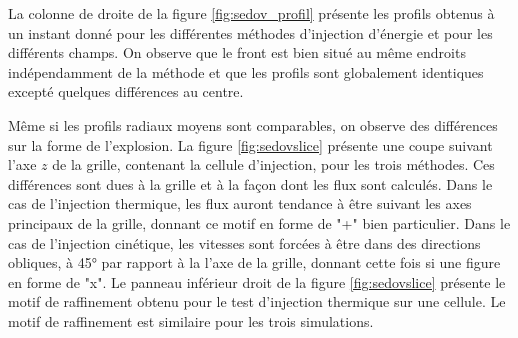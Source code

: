 La colonne de droite de la figure \ref{fig:sedov_profil} présente les profils obtenus à un instant donné pour les différentes méthodes d'injection d'énergie et pour les différents champs.
On observe que le front est bien situé au même endroits indépendamment de la méthode et que les profils sont globalement identiques excepté quelques différences au centre.

Même si les profils radiaux moyens sont comparables, on observe des différences sur la forme de l'explosion.
La figure \ref{fig:sedovslice} présente une coupe suivant l'axe $z$ de la grille, contenant la cellule d'injection, pour les trois méthodes.
Ces différences sont dues à la grille et à la façon dont les flux sont calculés.
Dans le cas de l'injection thermique, les flux auront tendance à être suivant les axes principaux de la grille, donnant ce motif en forme de "+" bien particulier.
Dans le cas de l'injection cinétique, les vitesses sont forcées à être dans des directions obliques, à 45° par rapport à la l'axe de la grille, donnant cette fois si une figure en forme de "x".
Le panneau inférieur droit de la figure \ref{fig:sedovslice} présente le motif de raffinement obtenu pour le test d'injection thermique sur une cellule.
Le motif de raffinement est similaire pour les trois simulations.

